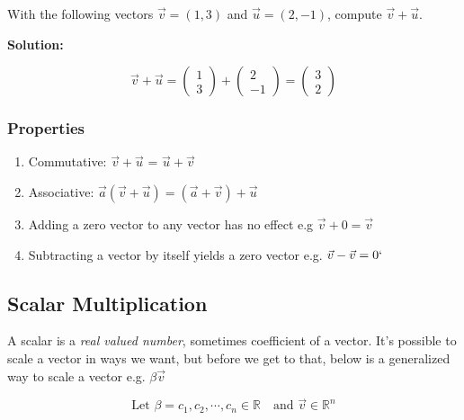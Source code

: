 \documentclass[11pt]{article}
\begin{document}
With the following vectors $\vec v = (1, 3)$ and $\vec u = (2, -1)$, compute $\vec v + \vec u$.

\vspace{0.15in}
\begin{center}
\textbf{Solution:}
\end{center}
\[
\vec v + \vec u = \begin{pmatrix}
1 \\ 3
\end{pmatrix}
+ 
\begin{pmatrix}
2 \\ -1
\end{pmatrix}
= 
\begin{pmatrix}
3 \\
2
\end{pmatrix}
\]
\subsubsection*{Properties}
\begin{enumerate}
\item Commutative: $\vec v + \vec u $ = $\vec u + \vec v$
\item Associative: $\vec a ( \vec v + \vec u ) = (\vec a + \vec v) + \vec u$
\item Adding a zero vector to any vector has no effect e.g $\vec v + 0 = \vec v$
\item Subtracting a vector by itself yields a zero vector e.g. $\vec v - \vec v = 0`$
\end{enumerate}

\subsection{Scalar Multiplication}
A scalar is a \textit{real valued number}, sometimes coefficient of a vector. It's possible to scale a vector in ways we want, but before we get to that, below is a generalized way to scale a vector e.g. $\beta \vec v$

\[
\text{Let } \beta = c_1, c_2, \cdots, c_n \in \mathbb{R} \quad \text{and } \vec v  \in \mathbb{R}^n 
\]
\end{document}
